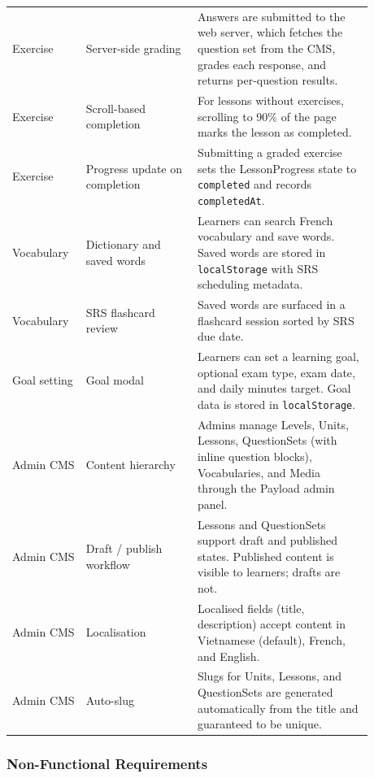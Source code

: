 \begin{longtable}{p{0.16\linewidth} p{0.28\linewidth} p{0.44\linewidth}}
Exercise & Server-side grading & Answers are submitted to the web server, which fetches the question set from the CMS, grades each response, and returns per-question results. \\
Exercise & Scroll-based completion & For lessons without exercises, scrolling to 90\% of the page marks the lesson as completed. \\
Exercise & Progress update on completion & Submitting a graded exercise sets the LessonProgress state to \texttt{completed} and records \texttt{completedAt}. \\
Vocabulary & Dictionary and saved words & Learners can search French vocabulary and save words. Saved words are stored in \texttt{localStorage} with SRS scheduling metadata. \\
Vocabulary & SRS flashcard review & Saved words are surfaced in a flashcard session sorted by SRS due date. \\
Goal setting & Goal modal & Learners can set a learning goal, optional exam type, exam date, and daily minutes target. Goal data is stored in \texttt{localStorage}. \\
Admin CMS & Content hierarchy & Admins manage Levels, Units, Lessons, QuestionSets (with inline question blocks), Vocabularies, and Media through the Payload admin panel. \\
Admin CMS & Draft / publish workflow & Lessons and QuestionSets support draft and published states. Published content is visible to learners; drafts are not. \\
Admin CMS & Localisation & Localised fields (title, description) accept content in Vietnamese (default), French, and English. \\
Admin CMS & Auto-slug & Slugs for Units, Lessons, and QuestionSets are generated automatically from the title and guaranteed to be unique. \\
\bottomrule
\end{longtable}

\subsubsection{Non-Functional Requirements}

